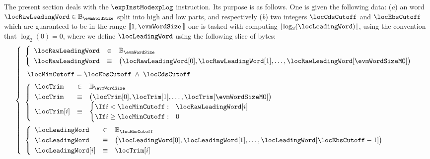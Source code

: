 The present section deals with the $\expInstModexpLog$ instruction.
Its purpose is as follows.
One is given the following data:
(\emph{a}) an \evm{} word $\locRawLeadingWord \in \mathbb{B}_{\evmWordSize}$ split into high and low parts, \locRawLeadingWordHi{} and \locRawLeadingWordLo{} respectively
(\emph{b}) two integers $\locCdsCutoff$ and $\locEbsCutoff$ which are guaranteed to be in the range $[\![ 1, \evmWordSize\, ]\!]$
one is tasked with computing $\lfloor \log_{2}(\locLeadingWord) \rfloor$, using the \cite{EYP-London} convention that $\log_{2}(0)  = 0$,
where we define $\locLeadingWord$ using the following slice of bytes:
\[
	\left\{ \begin{array}{lcl}
		\left\{ \begin{array}{lcl}
			\locRawLeadingWord & \in    & \mathbb{B}_{\evmWordSize}                                                                          \vspace{1mm} \\
			\locRawLeadingWord & \equiv & \big(\locRawLeadingWord[0], \locRawLeadingWord[1], \dots, \locRawLeadingWord[\evmWordSizeMO] \big)              \\
		\end{array} \right.
		\vspace{2mm} \\
		~ \locMinCutoff = \locEbsCutoff \; \wedge \; \locCdsCutoff 
		\vspace{2mm} \\
		\left\{ \begin{array}{lcl}
			\locTrim & \in    & \mathbb{B}_{\evmWordSize}                                            \vspace{1mm} \\
			\locTrim & \equiv & \big(\locTrim[0], \locTrim[1], \dots, \locTrim[\evmWordSizeMO] \big)              \\
			\locTrim[i] & \equiv &
			\begin{cases}
				\If i <    \locMinCutoff: & \locRawLeadingWord[i] \\
				\If i \geq \locMinCutoff: & 0                     \\
			\end{cases} \\
		\end{array} \right.
		\vspace{2mm} \\
		\left\{ \begin{array}{lcl}
			\locLeadingWord    & \in    & \mathbb{B}_{\locEbsCutoff}                                                                   \vspace{1mm} \\
			\locLeadingWord    & \equiv & \big(\locLeadingWord[0], \locLeadingWord[1], \dots, \locLeadingWord[\locEbsCutoff - 1] \big) \vspace{1mm} \\
			\locLeadingWord[i] & \equiv & \locTrim[i]                                                                                               \\
		\end{array} \right.
		\\
	\end{array} \right.
\]
